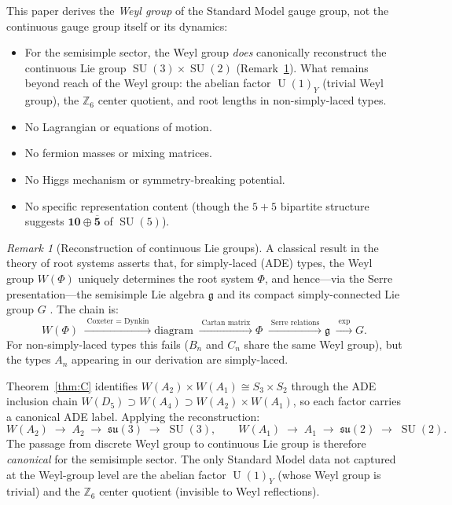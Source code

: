 \documentclass[11pt,reqno]{amsart}
\theoremstyle{plain}
\theoremstyle{definition}
\theoremstyle{remark}
\newtheorem{remark}[theorem]{Remark}
\newcommand{\Z}{\mathbb{Z}}
\DeclareMathOperator{\SU}{SU}
\DeclareMathOperator{\U}{U}
\begin{document}
This paper derives the \emph{Weyl group} of the Standard
Model gauge group, not the continuous gauge group itself
or its dynamics:
\begin{itemize}
\item For the semisimple sector, the Weyl group
  \emph{does} canonically reconstruct the continuous Lie
  group $\SU(3)\times\SU(2)$
  (Remark~\ref{rem:reconstruction}).
  What remains beyond reach of the Weyl group:
  the abelian factor $\U(1)_Y$ (trivial Weyl group),
  the $\Z_6$ center quotient, and root lengths in
  non-simply-laced types.
\item No Lagrangian or equations of motion.
\item No fermion masses or mixing matrices.
\item No Higgs mechanism or symmetry-breaking potential.
\item No specific representation content (though the $5+5$
  bipartite structure suggests $\mathbf{10}\oplus
  \overline{\mathbf{5}}$ of $\SU(5)$).
\end{itemize}

\begin{remark}[Reconstruction of continuous Lie groups]
\label{rem:reconstruction}
A classical result in the theory of root systems asserts that,
for simply-laced (ADE) types, the Weyl group $W(\Phi)$
uniquely determines the root system $\Phi$, and hence---via
the Serre presentation---the semisimple Lie algebra
$\mathfrak{g}$ and its compact simply-connected Lie group $G$
\cite{Humphreys1990, Bourbaki1968}.
The chain is:
\[
  W(\Phi)
  \;\xrightarrow{\;\text{Coxeter = Dynkin}\;}
  \text{diagram}
  \;\xrightarrow{\;\text{Cartan matrix}\;}
  \Phi
  \;\xrightarrow{\;\text{Serre relations}\;}
  \mathfrak{g}
  \;\xrightarrow{\;\exp\;}
  G.
\]
For non-simply-laced types this fails ($B_n$ and $C_n$ share
the same Weyl group), but the types $A_n$ appearing in our
derivation are simply-laced.

Theorem~\ref{thm:C} identifies
$W(A_2) \times W(A_1) \cong S_3 \times S_2$
through the ADE inclusion chain
$W(D_5) \supset W(A_4) \supset W(A_2) \times W(A_1)$,
so each factor carries a canonical ADE label.
Applying the reconstruction:
\[
  W(A_2) \;\longrightarrow\; A_2
  \;\longrightarrow\; \mathfrak{su}(3)
  \;\longrightarrow\; \SU(3),
  \qquad
  W(A_1) \;\longrightarrow\; A_1
  \;\longrightarrow\; \mathfrak{su}(2)
  \;\longrightarrow\; \SU(2).
\]
The passage from discrete Weyl group to continuous Lie group
is therefore \emph{canonical} for the semisimple sector.
The only Standard Model data not captured at the Weyl-group
level are the abelian factor $\U(1)_Y$ (whose Weyl group is
trivial) and the $\Z_6$ center quotient (invisible to Weyl
reflections).
\end{remark}
\end{document}
